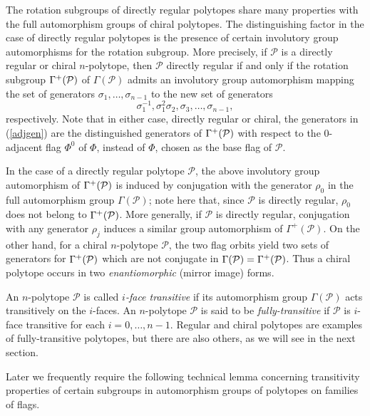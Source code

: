 \documentclass[12pt]{article}
\renewcommand{\>}{\rangle}
\theoremstyle{definition}\newtheorem{definition}{Definition}[section]
\begin{document}
The rotation subgroups of directly regular polytopes share many properties with the full automorphism groups of chiral polytopes. The distinguishing factor in the case of directly regular polytopes is the presence of certain involutory group automorphisms for the rotation subgroup. More precisely, if $\mathcal{P}$ is a directly regular or chiral $n$-polytope, then $\mathcal{P}$ directly regular if and only if the rotation subgroup $\Gamma^{+}({\cal P})$ of $\Gamma(\mathcal{P})$ admits an involutory group automorphism mapping the set of generators $\sigma_1,\ldots,\sigma_{n-1}$ to the new set of generators 
\begin{equation}
\label{adjgen}
\sigma_{1}^{-1},\sigma_{1}^{2}\sigma_2,\sigma_3,\ldots,\sigma_{n-1},
\end{equation} 
respectively. Note that in either case, directly regular or chiral, the generators in (\ref{adjgen}) are the distinguished generators of $\Gamma^{+}({\cal P})$ with respect to the $0$-adjacent flag $\Phi^0$ of $\Phi$, instead of $\Phi$, chosen as the base flag of $\mathcal{P}$. 

In the case of a directly regular polytope $\mathcal{P}$, the above involutory group automorphism of $\Gamma^{+}({\cal P})$ is induced by conjugation with the generator $\rho_0$ in the full automorphism group $\Gamma(\mathcal{P})$; note here that, since $\mathcal{P}$ is directly regular, $\rho_0$ does not belong to $\Gamma^{+}({\cal P})$. More generally, if $\mathcal{P}$ is directly regular, conjugation with any generator $\rho_j$ induces a similar group automorphism of $\Gamma^{+}(\mathcal{P})$. On the other hand, for a chiral $n$-polytope $\mathcal{P}$, the two flag orbits yield two sets of generators for $\Gamma^{+}({\cal P})$ which are not conjugate in $\Gamma(\mathcal{P})=\Gamma^{+}({\cal P})$. Thus a chiral polytope occurs in two \emph{enantiomorphic} (mirror image) forms.

An $n$-polytope $\mathcal{P}$ is called {\em $i$-face transitive} if its automorphism group $\Gamma(\mathcal{P})$ acts transitively on the $i$-faces. An $n$-polytope $\mathcal{P}$ is said to be {\em fully-transitive} if $\mathcal{P}$ is $i$-face transitive for each $i =0,\dots,n-1$. Regular and chiral polytopes are examples of fully-transitive polytopes, but there are also others, as we will see in the next section.
\smallskip 

Later we frequently require the following technical lemma concerning transitivity properties of certain subgroups in automorphism groups of polytopes on families of flags.
\end{document}
